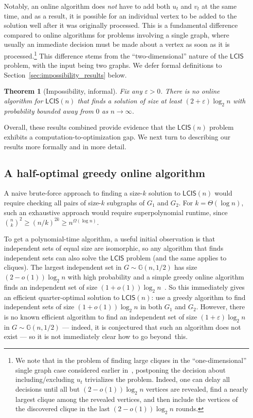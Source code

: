 \documentclass[11pt]{article}
\theoremstyle{plain}
\newtheorem{theorem}{Theorem}
\theoremstyle{definition}
\theoremstyle{remark}
\newcommand{\Gnhalf}{\mathbb{G}(n,1/2)}
\newcommand{\eps}{\varepsilon}
\newcommand{\MCS}{\mathsf{LCIS}}
\begin{document}
Notably, an online algorithm does \emph{not} have to add both $u_{t}$ and $v_{t}$ at the same time, and as a result, it is possible for an individual vertex to be added to the solution well after it was originally processed. 
This is a fundamental difference compared to online algorithms for problems involving a single graph, where usually an immediate decision must be made about a vertex as soon as it is processed.\footnote{We note that in the problem of finding large cliques in the ``one-dimensional'' single graph case considered earlier in~\cite{GKW25}, postponing the decision about including/excluding $u_t$ trivializes the problem. Indeed, one can delay all decisions until all but $(2-o(1))\log_2 n$ vertices are revealed, find a nearly largest clique among the revealed vertices, and then include the vertices of the discovered clique in the last $(2-o(1))\log_2 n$ rounds.}
This difference stems from the ``two-dimensional'' nature of the $\MCS$ problem, with the input being two graphs. 
We defer formal definitions to Section~\ref{sec:impossibility_results} below. 


\begin{theorem}[Impossibility, informal]\label{thm:impossibility-informal}
    Fix any $\eps > 0$. There is no online algorithm for $\MCS(n)$ that finds a solution of size at least $(2+\eps) \log_{2} n$ with probability bounded away from $0$ as $n \to \infty$. 
\end{theorem}

Overall, these results combined provide evidence that the $\MCS(n)$ problem exhibits a computation-to-optimization gap. 
We next turn to describing our results more formally and in more detail. 


\subsection{A half-optimal greedy online algorithm}
A naive brute-force approach to finding a size-$k$ solution to $\MCS(n)$ would require checking all pairs of size-$k$ subgraphs of $G_1$ and $G_2$. For $k = \Theta(\log n)$, such an exhaustive approach would require superpolynomial runtime, since
$\binom{n}{k}^2 \geq (n/k)^{2k} \geq n^{\Omega(\log n)}$. 

To get a polynomial-time algorithm, a useful initial observation is that independent sets of equal size are isomorphic, so any algorithm that finds independent sets can also solve the $\MCS$ problem (and the same applies to cliques). 
The largest independent set in $G \sim \Gnhalf$ has size $(2-o(1)) \log_2 n$ with high probability 
and a simple greedy online algorithm finds an independent set of size $(1+o(1)) \log_2 n$~\cite{grimmett1975colouring,Kar76}. 
So this immediately gives an efficient quarter-optimal solution to $\MCS(n)$: use a greedy algorithm to find independent sets of size $(1+o(1)) \log_2 n$ in both $G_{1}$ and $G_{2}$. 
However, there is no known efficient algorithm to find an independent set of size $(1+\eps) \log_2 n$ in $G \sim \Gnhalf$ --- indeed, it is conjectured that such an algorithm does not exist --- so it is not immediately clear how to go beyond~this. 
\end{document}
